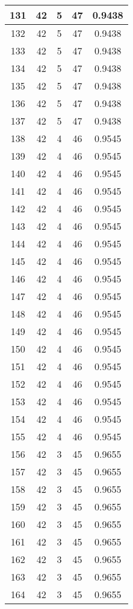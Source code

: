 \documentclass[letterpaper, 12pt]{article}
\begin{document}
\begin{longtable}{|c|c|c|c|c|}
\hline
131 & 42 & 5 & 47 & 0.9438 \\
\hline
132 & 42 & 5 & 47 & 0.9438 \\
\hline
133 & 42 & 5 & 47 & 0.9438 \\
\hline
134 & 42 & 5 & 47 & 0.9438 \\
\hline
135 & 42 & 5 & 47 & 0.9438 \\
\hline
136 & 42 & 5 & 47 & 0.9438 \\
\hline
137 & 42 & 5 & 47 & 0.9438 \\
\hline
138 & 42 & 4 & 46 & 0.9545 \\
\hline
139 & 42 & 4 & 46 & 0.9545 \\
\hline
140 & 42 & 4 & 46 & 0.9545 \\
\hline
141 & 42 & 4 & 46 & 0.9545 \\
\hline
142 & 42 & 4 & 46 & 0.9545 \\
\hline
143 & 42 & 4 & 46 & 0.9545 \\
\hline
144 & 42 & 4 & 46 & 0.9545 \\
\hline
145 & 42 & 4 & 46 & 0.9545 \\
\hline
146 & 42 & 4 & 46 & 0.9545 \\
\hline
147 & 42 & 4 & 46 & 0.9545 \\
\hline
148 & 42 & 4 & 46 & 0.9545 \\
\hline
149 & 42 & 4 & 46 & 0.9545 \\
\hline
150 & 42 & 4 & 46 & 0.9545 \\
\hline
151 & 42 & 4 & 46 & 0.9545 \\
\hline
152 & 42 & 4 & 46 & 0.9545 \\
\hline
153 & 42 & 4 & 46 & 0.9545 \\
\hline
154 & 42 & 4 & 46 & 0.9545 \\
\hline
155 & 42 & 4 & 46 & 0.9545 \\
\hline
156 & 42 & 3 & 45 & 0.9655 \\
\hline
157 & 42 & 3 & 45 & 0.9655 \\
\hline
158 & 42 & 3 & 45 & 0.9655 \\
\hline
159 & 42 & 3 & 45 & 0.9655 \\
\hline
160 & 42 & 3 & 45 & 0.9655 \\
\hline
161 & 42 & 3 & 45 & 0.9655 \\
\hline
162 & 42 & 3 & 45 & 0.9655 \\
\hline
163 & 42 & 3 & 45 & 0.9655 \\
\hline
164 & 42 & 3 & 45 & 0.9655 \\

\end{longtable}
\end{document}
